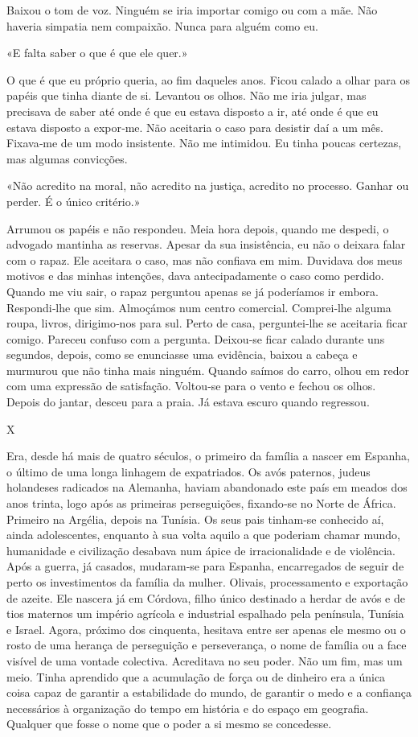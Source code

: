 Baixou o tom de voz. Ninguém se iria importar comigo ou com a mãe. Não
haveria simpatia nem compaixão. Nunca para alguém como eu.

«E falta saber o que é que ele quer.»

O que é que eu próprio queria, ao fim daqueles anos. Ficou calado a
olhar para os papéis que tinha diante de si. Levantou os olhos. Não me
iria julgar, mas precisava de saber até onde é que eu estava disposto a
ir, até onde é que eu estava disposto a expor­‑me. Não aceitaria o caso
para desistir daí a um mês. Fixava­‑me de um modo insistente. Não me
intimidou. Eu tinha poucas certezas, mas algumas convicções.

«Não acredito na moral, não acredito na justiça, acredito no processo.
Ganhar ou perder. É o único critério.»

Arrumou os papéis e não respondeu. Meia hora depois, quando me despedi,
o advogado mantinha as reservas. Apesar da sua insistência, eu não o
deixara falar com o rapaz. Ele aceitara o caso, mas não confiava em mim.
Duvidava dos meus motivos e das minhas intenções, dava antecipadamente o
caso como perdido. Quando me viu sair, o rapaz perguntou apenas se já
poderíamos ir embora. Respondi­‑lhe que sim. Almoçámos num centro
comercial. Comprei­‑lhe alguma roupa, livros, dirigimo­‑nos para sul.
Perto de casa, perguntei­‑lhe se aceitaria ficar comigo. Pareceu confuso
com a pergunta. Deixou­‑se ficar calado durante uns segundos, depois,
como se enunciasse uma evidência, baixou a cabeça e murmurou que não
tinha mais ninguém. Quando saímos do carro, olhou em redor com uma
expressão de satisfação. Voltou­‑se para o vento e fechou os olhos.
Depois do jantar, desceu para a praia. Já estava escuro quando
regressou.

X

Era, desde há mais de quatro séculos, o primeiro da família a nascer em
Espanha, o último de uma longa linhagem de expatriados. Os avós
paternos, judeus holandeses radicados na Alemanha, haviam abandonado
este país em meados dos anos trinta, logo após as primeiras
perseguições, fixando­‑se no Norte de África. Primeiro na Argélia,
depois na Tunísia. Os seus pais tinham­‑se conhecido aí, ainda
adolescentes, enquanto à sua volta aquilo a que poderiam chamar mundo,
humanidade e civilização desabava num ápice de irracionalidade e de
violência. Após a guerra, já casados, mudaram­‑se para Espanha,
encarregados de seguir de perto os investimentos da família da mulher.
Olivais, processamento e exportação de azeite. Ele nascera já em
Córdova, filho único destinado a herdar de avós e de tios maternos um
império agrícola e industrial espalhado pela península, Tunísia e
Israel. Agora, próximo dos cinquenta, hesitava entre ser apenas ele
mesmo ou o rosto de uma herança de perseguição e perseverança, o nome de
família ou a face visível de uma vontade colectiva. Acreditava no seu
poder. Não um fim, mas um meio. Tinha aprendido que a acumulação de
força ou de dinheiro era a única coisa capaz de garantir a estabilidade
do mundo, de garantir o medo e a confiança necessários à organização do
tempo em história e do espaço em geografia. Qualquer que fosse o nome
que o poder a si mesmo se concedesse.

